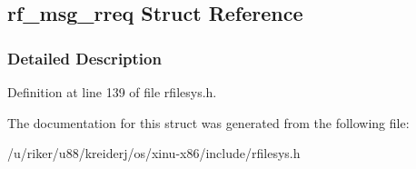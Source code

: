 \hypertarget{structrf__msg__rreq}{}\subsection{rf\+\_\+msg\+\_\+rreq Struct Reference}
\label{structrf__msg__rreq}


\subsubsection{Detailed Description}


Definition at line 139 of file rfilesys.\+h.



The documentation for this struct was generated from the following file\+:\begin{DoxyCompactItemize}
\item 
/u/riker/u88/kreiderj/os/xinu-\/x86/include/rfilesys.\+h\end{DoxyCompactItemize}
